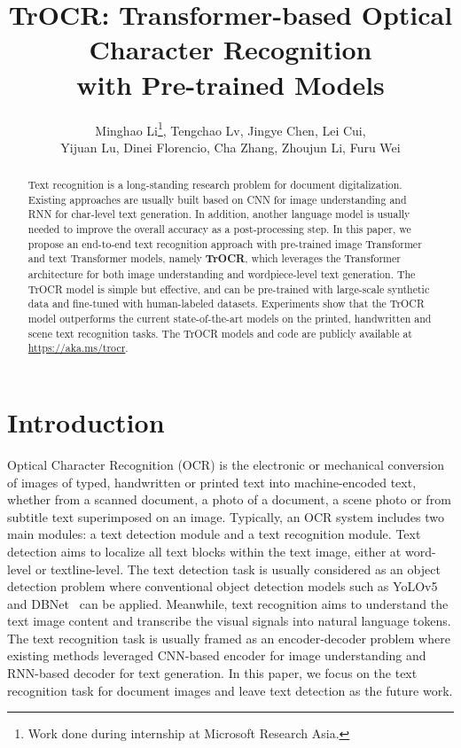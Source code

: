 \documentclass[letterpaper]{article} \usepackage{aaai23}  \usepackage{times}  \usepackage{helvet}  \usepackage{courier}  \usepackage[hyphens]{url}  \usepackage{graphicx} \urlstyle{rm} \def\UrlFont{\rm}  \usepackage{natbib}  \usepackage{caption} \frenchspacing  \setlength{\pdfpagewidth}{8.5in} \setlength{\pdfpageheight}{11in} \usepackage{algorithm}
\title{TrOCR: Transformer-based Optical Character Recognition\\ with Pre-trained Models}
\author{Minghao Li\thanks{Work done during internship at Microsoft Research Asia.}, Tengchao Lv, Jingye Chen, Lei Cui, \\
Yijuan Lu, Dinei Florencio, Cha Zhang, Zhoujun Li, Furu Wei}
\begin{document}
\maketitle

\begin{abstract}
Text recognition is a long-standing research problem for document digitalization. Existing approaches are usually built based on CNN for image understanding and RNN for char-level text generation. In addition, another language model is usually needed to improve the overall accuracy as a post-processing step. In this paper, we propose an end-to-end text recognition approach with pre-trained image Transformer and text Transformer models, namely \textbf{TrOCR}, which leverages the Transformer architecture for both image understanding and wordpiece-level text generation. The TrOCR model is simple but effective, and can be pre-trained with large-scale synthetic data and fine-tuned with human-labeled datasets. Experiments show that the TrOCR model outperforms the current state-of-the-art models on the printed, handwritten and scene text recognition tasks. The TrOCR models and code are publicly available at \url{https://aka.ms/trocr}.
\end{abstract}

\section{Introduction}

Optical Character Recognition (OCR) is the electronic or mechanical conversion of images of typed, handwritten or printed text into machine-encoded text, whether from a scanned document, a photo of a document, a scene photo or from subtitle text superimposed on an image. Typically, an OCR system includes two main modules: a text detection module and a text recognition module. Text detection aims to localize all text blocks within the text image, either at word-level or textline-level. The text detection task is usually considered as an object detection problem where conventional object detection models such as YoLOv5 and DBNet~\cite{liao2019realtime} can be applied. Meanwhile, text recognition aims to understand the text image content and transcribe the visual signals into natural language tokens. The text recognition task is usually framed as an encoder-decoder problem where existing methods leveraged CNN-based encoder for image understanding and RNN-based decoder for text generation. In this paper, we focus on the text recognition task for document images and leave text detection as the future work.
\end{document}
